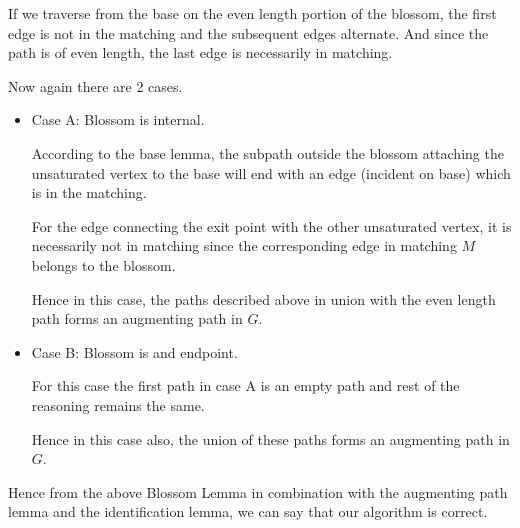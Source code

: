 \documentclass{article}
\begin{document}
If we traverse from the base on the even length portion of the blossom, the first edge is not in the matching and the subsequent edges alternate. And since the path is of even length, the last edge is necessarily in matching.

Now again there are 2 cases.
\begin{itemize}
    \item Case A: Blossom is internal.
        
        According to the base lemma, the subpath outside the blossom attaching the unsaturated vertex to the base will end with an edge (incident on base) which is in the matching.
        
        For the edge connecting the exit point with the other unsaturated vertex, it is necessarily not in matching since the corresponding edge in matching $M$ belongs to the blossom.
        
        Hence in this case, the paths described above in union with the even length path forms an augmenting path in $G$.
    \item Case B: Blossom is and endpoint.
    
        For this case the first path in case A is an empty path and rest of the reasoning remains the same.
        
        Hence in this case also, the union of these paths forms an augmenting path in $G$.
\end{itemize}
Hence from the above Blossom Lemma in combination with the augmenting path lemma and the identification lemma, we can say that our algorithm is correct.
\end{document}
